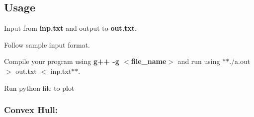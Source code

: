 \subsection*{Usage}


\begin{DoxyEnumerate}
\item Input from {\bfseries inp.\+txt} and output to {\bfseries out.\+txt}.
\item Follow sample input format.
\item Compile your program using {\bfseries g++ -\/g $<$file\+\_\+name$>$} and run using $\ast$$\ast$./a.out $>$ out.\+txt $<$ inp.\+txt$\ast$$\ast$.
\item Run python file to plot
\end{DoxyEnumerate}

\subsubsection*{Convex Hull\+:}

 
